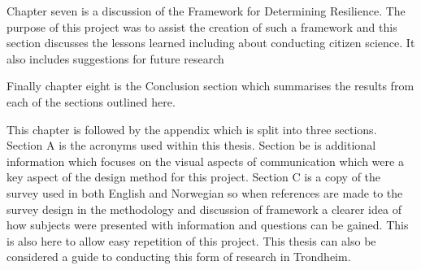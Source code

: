 Chapter seven is a discussion of the Framework for Determining Resilience. The purpose of this project was to assist the creation of such a framework and this section discusses the lessons learned including about conducting citizen science. It also includes suggestions for future research

Finally chapter eight is the Conclusion section which summarises the results from each of the sections outlined here.

This chapter is followed by the appendix which is split into three sections. Section A is the acronyms used within this thesis. Section be is additional information which focuses on the visual aspects of communication which were a key aspect of the design method for this project. Section C is a copy of the survey used in both English and Norwegian so when references are made to the survey design in the methodology and  discussion of framework a clearer idea of how subjects were presented with information and questions can be gained. This is also here to allow easy repetition of this project. This thesis can also be considered a guide to conducting this form of research in Trondheim. 
